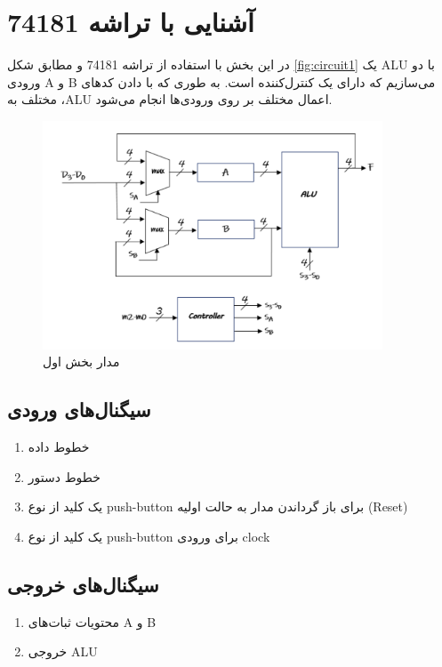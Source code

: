 \section{
آشنایی با تراشه 74181
}

در این بخش با استفاده از تراشه
74181
و مطابق شکل
\eqref{fig:circuit1}
یک
ALU
با دو ورودی
A
و
B
می‌سازیم که دارای یک کنترل‌کننده است.
به طوری که با دادن کدهای مختلف به
،ALU
اعمال مختلف بر روی ورودی‌ها انجام می‌شود.

\begin{figure}[h!]
    \centering
    \includegraphics[width=0.9\textwidth]{part1/circuit.png}
    \caption{
    مدار بخش اول
    }
    \label{fig:circuit1}
\end{figure}

\subsection{
سیگنال‌های ورودی
}
\begin{enumerate}
    \item خطوط داده
    \item خطوط دستور
    \item یک کلید از نوع
    push-button
    برای باز گرداندن مدار به حالت اولیه
    (Reset)
    \item یک کلید از نوع
    push-button
    برای ورودی
    clock
\end{enumerate}

\subsection{
سیگنال‌های خروجی
}
\begin{enumerate}
    \item محتویات ثبات‌های
    A و B
    \item خروجی ALU
\end{enumerate}

